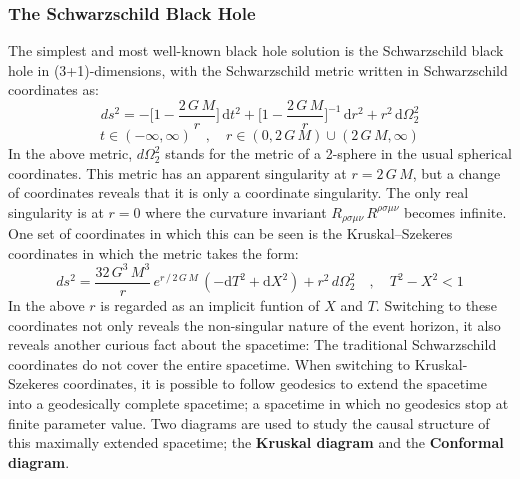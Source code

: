 \subsubsection{The Schwarzschild Black Hole}
The simplest and most well-known black hole solution is the Schwarzschild black hole in (3+1)-dimensions, with the Schwarzschild metric written in Schwarzschild coordinates as:
%
%
\begin{equation}
ds^2 = -\bigg[1 - \frac{2 \, G \, M}{r} \bigg] \, \mathrm{d}t^2
+ \bigg[1 - \frac{2 \, G \, M}{r} \bigg]^{-1} \, \mathrm{d}r^2
+ r^2 \, \mathrm{d}\Omega_2^2
\end{equation}
%
\begin{equation}
t \in (-\infty, \infty)
\quad , \quad
r \in (0, 2 \, G \, M) \cup (2 \, G \, M, \infty)
\end{equation}
%
%
In the above metric, $d\Omega_2^2$ stands for the metric of a 2-sphere in the usual spherical coordinates. This metric has an apparent singularity at $r = 2 \, G \, M$, but a change of coordinates reveals that it is only a coordinate singularity. The only real singularity is at $r = 0$ where the curvature invariant $R_{\rho\sigma\mu\nu} \,R^{\rho\sigma\mu\nu} $ becomes infinite. One set of coordinates in which this can be seen is the Kruskal–Szekeres coordinates in which the metric takes the form:
%
%
\begin{equation}\label{SW_metric_kruskal}
ds^2 = \frac{32 \, G^3 \, M^3}{r} \, e^{r \, / \, 2 \, G \, M} \,
(-\mathrm{d}T^2 + \mathrm{d}X^2)
+ r^2 \, d\Omega_2^2
%
\quad , \quad
%
T^2 - X^2 < 1
\end{equation}
%
%
In the above $r$ is regarded as an implicit funtion of $X$ and $T$. Switching to these coordinates not only reveals the non-singular nature of the event horizon, it also reveals another curious fact about the spacetime: The traditional Schwarzschild coordinates do not cover the entire spacetime. When switching to Kruskal-Szekeres coordinates, it is possible to follow geodesics to extend the spacetime into a geodesically complete spacetime; a spacetime in which no geodesics stop at finite parameter value. Two diagrams are used to study the causal structure of this maximally extended spacetime; the \textbf{Kruskal diagram} and the \textbf{Conformal diagram}.
%
